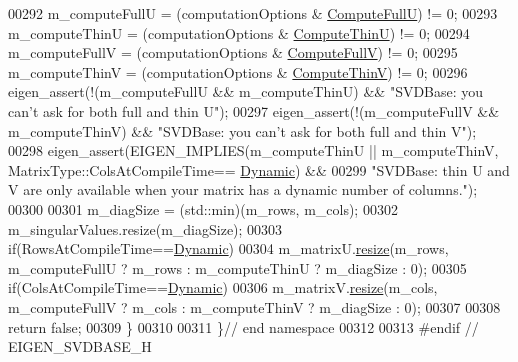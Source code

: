 \begin{DoxyCode}
00292   m\_computeFullU = (computationOptions & \hyperlink{group__enums_ggae3e239fb70022eb8747994cf5d68b4a9a2b4f91ca5859a4159dbfe8090043817f}{ComputeFullU}) != 0;
00293   m\_computeThinU = (computationOptions & \hyperlink{group__enums_ggae3e239fb70022eb8747994cf5d68b4a9af8c742a1aa87773e165eae406c9ccaf8}{ComputeThinU}) != 0;
00294   m\_computeFullV = (computationOptions & \hyperlink{group__enums_ggae3e239fb70022eb8747994cf5d68b4a9a52c6f7e80bbf9a42297c88f700245b51}{ComputeFullV}) != 0;
00295   m\_computeThinV = (computationOptions & \hyperlink{group__enums_ggae3e239fb70022eb8747994cf5d68b4a9a1055e53fa95c8ae04a07ebb72cfafd95}{ComputeThinV}) != 0;
00296   eigen\_assert(!(m\_computeFullU && m\_computeThinU) && \textcolor{stringliteral}{"SVDBase: you can't ask for both full and thin U"});
00297   eigen\_assert(!(m\_computeFullV && m\_computeThinV) && \textcolor{stringliteral}{"SVDBase: you can't ask for both full and thin V"});
00298   eigen\_assert(EIGEN\_IMPLIES(m\_computeThinU || m\_computeThinV, MatrixType::ColsAtCompileTime==
      \hyperlink{namespace_eigen_ad81fa7195215a0ce30017dfac309f0b2}{Dynamic}) &&
00299            \textcolor{stringliteral}{"SVDBase: thin U and V are only available when your matrix has a dynamic number of columns."});
00300 
00301   m\_diagSize = (std::min)(m\_rows, m\_cols);
00302   m\_singularValues.resize(m\_diagSize);
00303   \textcolor{keywordflow}{if}(RowsAtCompileTime==\hyperlink{namespace_eigen_ad81fa7195215a0ce30017dfac309f0b2}{Dynamic})
00304     m\_matrixU.\hyperlink{class_eigen_1_1_plain_object_base_a99d9054ee2d5a40c6e00ded0265e9cea}{resize}(m\_rows, m\_computeFullU ? m\_rows : m\_computeThinU ? m\_diagSize : 0);
00305   \textcolor{keywordflow}{if}(ColsAtCompileTime==\hyperlink{namespace_eigen_ad81fa7195215a0ce30017dfac309f0b2}{Dynamic})
00306     m\_matrixV.\hyperlink{class_eigen_1_1_plain_object_base_a99d9054ee2d5a40c6e00ded0265e9cea}{resize}(m\_cols, m\_computeFullV ? m\_cols : m\_computeThinV ? m\_diagSize : 0);
00307 
00308   \textcolor{keywordflow}{return} \textcolor{keyword}{false};
00309 \}
00310 
00311 \}\textcolor{comment}{// end namespace}
00312 
00313 \textcolor{preprocessor}{#endif // EIGEN\_SVDBASE\_H}
\end{DoxyCode}
